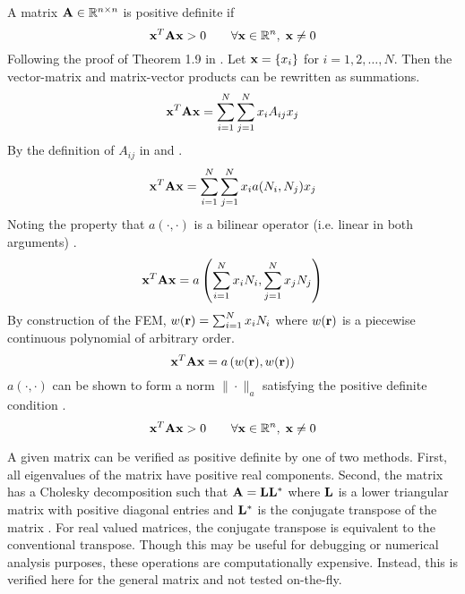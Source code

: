     A matrix $\mathbf{A} \in \mathbb{R}^{n \times n}$ is positive definite if
    \begin{equation} \label{eq:positive_definite}
      \mathbf{x}^{T} \mathbf{A} \mathbf{x} > 0 \qquad \forall \mathbf{x} \in \mathbb{R}^{n}, \; \mathbf{x} \ne 0
    \end{equation}
    Following the proof of Theorem 1.9 in \cite{textbookhughes}. Let 
    $\mathbf{x} = \{x_i\}$ for $i = 1,2,\ldots,N$. Then the vector-matrix and 
    matrix-vector products can be rewritten as summations.
    \begin{equation}
      \mathbf{x}^{T} \mathbf{A} \mathbf{x} = \sum_{i=1}^{N} \sum_{j=1}^{N} x_i A_{ij} x_j
    \end{equation}
    By the definition of $A_{ij}$ in  and 
    .
    \begin{equation}
      \mathbf{x}^{T} \mathbf{A} \mathbf{x} = 
        \sum_{i=1}^{N} \sum_{j=1}^{N} x_i a(N_i,N_j) x_j
    \end{equation}
    Noting the property that $a(\cdot,\cdot)$ is a bilinear operator (i.e.
    linear in both arguments) \cite{textbookli}.
    \begin{equation}
      \mathbf{x}^{T} \mathbf{A} \mathbf{x} =
        a \left( \sum_{i=1}^{N} x_i N_i, \sum_{j=1}^{N} x_j N_j 
        \right)
    \end{equation}
    By construction of the FEM, $w(\mathbf{r}) = \sum_{i=1}^{N} x_i N_i$ where 
    $w(\mathbf{r})$ is a piecewise continuous polynomial of arbitrary order.
    \begin{equation}
      \mathbf{x}^{T} \mathbf{A} \mathbf{x} = a \left(w(\mathbf{r}),w(\mathbf{r})\right)
    \end{equation}
    $a(\cdot,\cdot)$ can be shown to form a norm $\|\cdot \|_a$
    \cite{textbookli} satisfying the positive definite condition
    .
    \begin{equation}
      \mathbf{x}^{T} \mathbf{A} \mathbf{x} > 0 \qquad \forall \mathbf{x} \in \mathbb{R}^{n}, \; \mathbf{x} \ne 0
    \end{equation}
    
    A given matrix can be verified as positive definite by one of two methods.
    First, all eigenvalues of the matrix have positive real components. Second, 
    the matrix has a Cholesky decomposition such that $\mathbf{A} = \mathbf{L} \mathbf{L}^*$ where 
    $\mathbf{L}$ is a lower triangular matrix with positive diagonal entries and 
    $\mathbf{L}^*$ is the conjugate transpose of the matrix \cite{textbookipsen}. For 
    real valued matrices, the conjugate transpose is equivalent to the 
    conventional transpose. Though this may be useful for debugging or numerical
    analysis purposes, these operations are computationally expensive. Instead,
    this is verified here for the general matrix and not tested on-the-fly.
    
